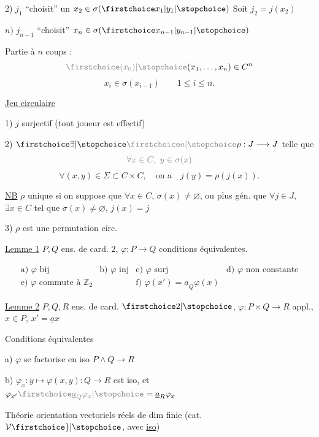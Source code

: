 2) $j_1$ ``choisit'' un $x_2\in\sigma(\unsure{x_1|y_1})$ Soit $j_2=j(x_2)$


$n)$ $j_{n-1}$ ``choisit'' $x_n\in\sigma(\unsure{x_{n-1}|y_{n-1}})$

Partie à $n$ coups :
\[
\deleted{\unsure{(x_0)}}(x_1,\ldots,x_n)\in C^n
\]
\[
x_i\in\sigma(x_{i-1})\qquad 1\leq i\leq n.
\]

\uline{Jeu circulaire}

1) $j$ surjectif (tout joueur est effectif)

2) $\unsure{\exists}\deleted{\unsure{a}}\rho:J\longrightarrow J$ telle que
\[
\deleted{\forall x\in C,\ y\in\sigma(x)}
\]
\[
\forall(x,y)\in\Sigma\subset C\times C,\quad\text{on a}\quad j(y)=\rho(j(x)).
\]

\uline{NB} $\rho$ unique si on suppose que $\forall x\in C$,  $\sigma(x)\neq\varnothing$, ou plus gén. que $\forall j\in J$, $\exists x\in C$ tel que $\sigma(x)\neq\varnothing$, $j(x)=j$

3) $\rho$ est une permutation circ.

\uline{Lemme 1} $P,Q$ ens. de card. $2$, $\varphi:P\longrightarrow Q$ conditions équivalentes.

\[
\begin{array}{llll}
\text{a) }\varphi\text{ bij}&\text{b) }\varphi\text{ inj}&\text{c) }\varphi\text{ surj}&\text{d) }\varphi\text{ non constante}\\
\text{e) }\varphi\text{ commute à }\mathbb{Z}_2&&\text{f) }\varphi(x')=\underline a_Q\varphi(x)
\end{array}
\]

\uline{Lemme 2} $P,Q,R$ ens. de card. $\unsure{2}$, $\varphi:P\times Q\longrightarrow R$ appl., $x\in P$, $x'=\underline a x$

Conditions équivalentes

a) $\varphi$ se factorise en iso $P\wedge Q\longrightarrow R$

b) $\varphi_x:y\longmapsto\varphi(x,y):Q\longrightarrow R$ est iso, et $\varphi_{x'}\deleted{\unsure{\underline a_Q\varphi_x}}=\underline a_R\varphi_x$

Théorie orientation  vectoriels réels de dim finie (cat. $\mathcal V\unsure{\}}$, avec \uline{iso})

